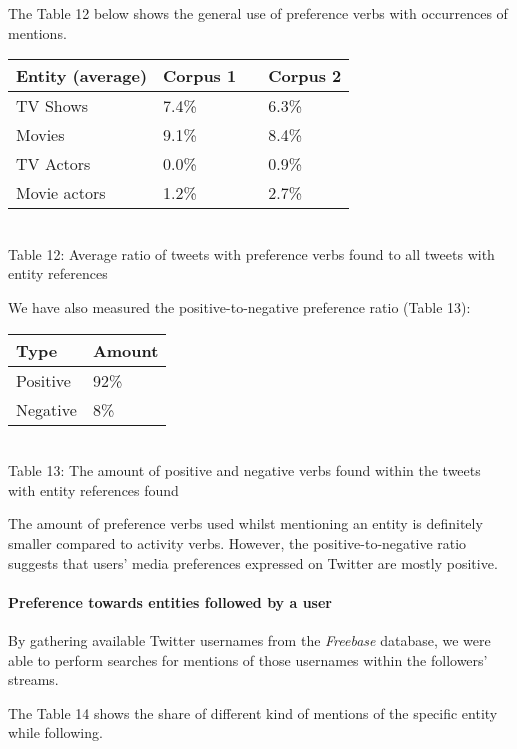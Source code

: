 The Table 12 below shows the general use of preference verbs with occurrences of
mentions.

\begin{center}
  \begin{tabular}{ | p{4cm} | p{2cm} | p{1cm}| p{2cm} | } \hline
    Entity (average) & Corpus 1 & & Corpus 2 \\ \hline
    TV Shows & 7.4\% & & 6.3\% \\ \hline
    Movies & 9.1\% & & 8.4\% \\ \hline
    TV Actors & 0.0\% & & 0.9\% \\ \hline
    Movie actors & 1.2\% & & 2.7\% \\ \hline
  \end{tabular} \\
  Table 12: Average ratio of tweets with preference verbs found to all tweets with entity references \\
\end{center}

We have also measured the positive-to-negative preference ratio (Table 13):

\begin{center}
  \begin{tabular}{ | p{3cm}| p{2cm} | } \hline
    Type & Amount \\ \hline
    Positive & 92\% \\ \hline
    Negative & 8\% \\ \hline
  \end{tabular} \\
  Table 13: The amount of positive and negative verbs found within the tweets with entity references found \\
\end{center}

The amount of preference verbs used whilst mentioning an entity is definitely
smaller compared to activity verbs. However, the positive-to-negative ratio suggests that users'
media preferences expressed on Twitter are mostly positive.

\paragraph{Preference towards entities followed by a user}
By gathering available Twitter usernames from the \textit{Freebase} database,
we were able to perform searches for mentions of those usernames within the followers' streams.

The Table 14 shows the share of different kind of mentions of the specific entity while following.

